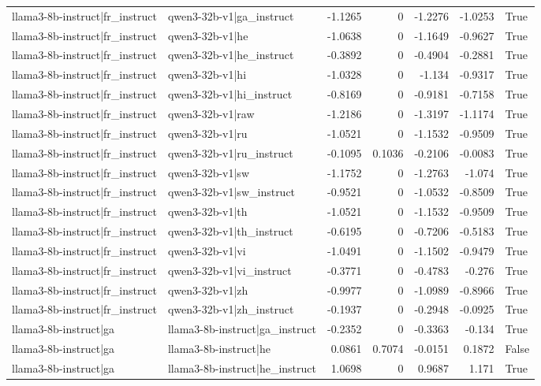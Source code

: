 \begin{table}
\begin{tabular}{l l r r r r l}
llama3-8b-instruct|fr_instruct & qwen3-32b-v1|ga_instruct & -1.1265 & 0 & -1.2276 & -1.0253 & True \\
llama3-8b-instruct|fr_instruct & qwen3-32b-v1|he & -1.0638 & 0 & -1.1649 & -0.9627 & True \\
llama3-8b-instruct|fr_instruct & qwen3-32b-v1|he_instruct & -0.3892 & 0 & -0.4904 & -0.2881 & True \\
llama3-8b-instruct|fr_instruct & qwen3-32b-v1|hi & -1.0328 & 0 & -1.134 & -0.9317 & True \\
llama3-8b-instruct|fr_instruct & qwen3-32b-v1|hi_instruct & -0.8169 & 0 & -0.9181 & -0.7158 & True \\
llama3-8b-instruct|fr_instruct & qwen3-32b-v1|raw & -1.2186 & 0 & -1.3197 & -1.1174 & True \\
llama3-8b-instruct|fr_instruct & qwen3-32b-v1|ru & -1.0521 & 0 & -1.1532 & -0.9509 & True \\
llama3-8b-instruct|fr_instruct & qwen3-32b-v1|ru_instruct & -0.1095 & 0.1036 & -0.2106 & -0.0083 & True \\
llama3-8b-instruct|fr_instruct & qwen3-32b-v1|sw & -1.1752 & 0 & -1.2763 & -1.074 & True \\
llama3-8b-instruct|fr_instruct & qwen3-32b-v1|sw_instruct & -0.9521 & 0 & -1.0532 & -0.8509 & True \\
llama3-8b-instruct|fr_instruct & qwen3-32b-v1|th & -1.0521 & 0 & -1.1532 & -0.9509 & True \\
llama3-8b-instruct|fr_instruct & qwen3-32b-v1|th_instruct & -0.6195 & 0 & -0.7206 & -0.5183 & True \\
llama3-8b-instruct|fr_instruct & qwen3-32b-v1|vi & -1.0491 & 0 & -1.1502 & -0.9479 & True \\
llama3-8b-instruct|fr_instruct & qwen3-32b-v1|vi_instruct & -0.3771 & 0 & -0.4783 & -0.276 & True \\
llama3-8b-instruct|fr_instruct & qwen3-32b-v1|zh & -0.9977 & 0 & -1.0989 & -0.8966 & True \\
llama3-8b-instruct|fr_instruct & qwen3-32b-v1|zh_instruct & -0.1937 & 0 & -0.2948 & -0.0925 & True \\
llama3-8b-instruct|ga & llama3-8b-instruct|ga_instruct & -0.2352 & 0 & -0.3363 & -0.134 & True \\
llama3-8b-instruct|ga & llama3-8b-instruct|he & 0.0861 & 0.7074 & -0.0151 & 0.1872 & False \\
llama3-8b-instruct|ga & llama3-8b-instruct|he_instruct & 1.0698 & 0 & 0.9687 & 1.171 & True \\

\end{tabular}
\end{table}
